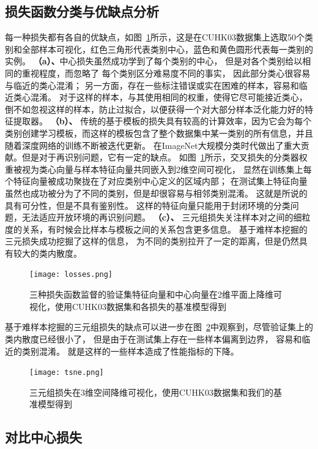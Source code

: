 \subsection{损失函数分类与优缺点分析}
每一种损失都有各自的优缺点，如图~\ref{fig:losses}所示，这是在CUHK03数据集上选取50个类别和全部样本可视化，红色三角形代表类别中心，蓝色和黄色圆形代表每一类别的实例。
\textbf{（a）、}中心损失虽然成功学到了每个类别的中心，
但是对各个类别给以相同的重视程度，而忽略了
每个类别区分难易度不同的事实，
因此部分类心很容易与临近的类心混淆；
另一方面，存在一些标注错误或实在困难的样本，容易和临近类心混淆。
对于这样的样本，与其使用相同的权重，使得它尽可能接近类心，倒不如忽视这样的样本，防止过拟合，以便获得一个对大部分样本泛化能力好的特征提取器。
\textbf{（b）、}
传统的基于模板的损失具有较高的计算效率，因为它会为每个类别创建学习模板，而这样的模板包含了整个数据集中某一类别的所有信息，并且随着深度网络的训练不断被迭代更新。
在ImageNet大规模分类时代做出了重大贡献。但是对于再识别问题，它有一定的缺点。
如图~\ref{fig:losses}所示，交叉损失的分类器权重被视为类心向量与样本特征向量共同嵌入到2维空间可视化，
显然在训练集上每个特征向量被成功聚拢在了对应类别中心定义的区域内部；
在测试集上特征向量虽然也成功被分为了不同的类别，但是却很容易与相邻类别混淆。
这就是所说的具有可分性，但是不具有鉴别性。
这样的特征向量只能用于封闭环境的分类问题，无法适应开放环境的再识别问题。
\textbf{（c）、}
三元组损失关注样本对之间的细粒度的关系，有时候会比样本与模板之间的关系包含更多信息。
基于难样本挖掘的三元损失成功挖掘了这样的信息，
为不同的类别拉开了一定的距离，但是仍然具有较大的类内散度。

\begin{figure}
	\centering
	\texttt{[image: losses.png]}
	\caption{三种损失函数监督的验证集特征向量和中心向量在2维平面上降维可视化，使用CUHK03数据集和各损失的基准模型得到}
	\label{fig:losses}
\end{figure}

基于难样本挖掘的三元组损失的缺点可以进一步在图~\ref{fig:tsne}中观察到，尽管验证集上的类内散度已经很小了，
但是由于在测试集上存在一些样本偏离到边界，
容易和临近的类别混淆。
就是这样的一些样本造成了性能指标的下降。

\begin{figure}
	\centering
	\texttt{[image: tsne.png]}
	\caption{三元组损失在3维空间降维可视化，使用CUHK03数据集和我们的基准模型得到}
	\label{fig:tsne}
\end{figure}

\subsection{对比中心损失}

